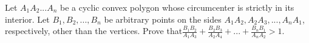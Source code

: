Let $A_1A_2 . . . A_n$ be a cyclic convex polygon whose circumcenter is strictly in its interior. Let $B_1, B_2, ..., B_n$ be arbitrary points on the sides $A_1A_2, A_2A_3, ..., A_nA_1$,  respectively, other than the vertices. Prove that$\frac{B_1B_2}{A_1A_3}+ \frac{B_2B_3}{A_2A_4}+...+\frac{B_nB_1}{A_nA_2}>1$.